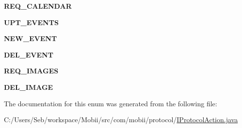 \begin{DoxyCompactItemize}
\item 
\hypertarget{enumcom_1_1mobii_1_1protocol_1_1_i_protocol_action_1_1cli_to_mob_a2282bc120d7a36f6180b37abd3b931c3}{{\bfseries R\-E\-Q\-\_\-\-C\-A\-L\-E\-N\-D\-A\-R}}\label{enumcom_1_1mobii_1_1protocol_1_1_i_protocol_action_1_1cli_to_mob_a2282bc120d7a36f6180b37abd3b931c3}

\item 
\hypertarget{enumcom_1_1mobii_1_1protocol_1_1_i_protocol_action_1_1cli_to_mob_af9a569aaf8d6ddeb48fe2a28d16efc7f}{{\bfseries U\-P\-T\-\_\-\-E\-V\-E\-N\-T\-S}}\label{enumcom_1_1mobii_1_1protocol_1_1_i_protocol_action_1_1cli_to_mob_af9a569aaf8d6ddeb48fe2a28d16efc7f}

\item 
\hypertarget{enumcom_1_1mobii_1_1protocol_1_1_i_protocol_action_1_1cli_to_mob_a0a559ebcd7fc42cbaae9cf6b1a059a89}{{\bfseries N\-E\-W\-\_\-\-E\-V\-E\-N\-T}}\label{enumcom_1_1mobii_1_1protocol_1_1_i_protocol_action_1_1cli_to_mob_a0a559ebcd7fc42cbaae9cf6b1a059a89}

\item 
\hypertarget{enumcom_1_1mobii_1_1protocol_1_1_i_protocol_action_1_1cli_to_mob_a8673719261b6d53fb43956512020cdf9}{{\bfseries D\-E\-L\-\_\-\-E\-V\-E\-N\-T}}\label{enumcom_1_1mobii_1_1protocol_1_1_i_protocol_action_1_1cli_to_mob_a8673719261b6d53fb43956512020cdf9}

\item 
\hypertarget{enumcom_1_1mobii_1_1protocol_1_1_i_protocol_action_1_1cli_to_mob_a8926d5405f606fee955d5790f5ff5541}{{\bfseries R\-E\-Q\-\_\-\-I\-M\-A\-G\-E\-S}}\label{enumcom_1_1mobii_1_1protocol_1_1_i_protocol_action_1_1cli_to_mob_a8926d5405f606fee955d5790f5ff5541}

\item 
\hypertarget{enumcom_1_1mobii_1_1protocol_1_1_i_protocol_action_1_1cli_to_mob_a36d74e43a25b84f575285928ea7f00b0}{{\bfseries D\-E\-L\-\_\-\-I\-M\-A\-G\-E}}\label{enumcom_1_1mobii_1_1protocol_1_1_i_protocol_action_1_1cli_to_mob_a36d74e43a25b84f575285928ea7f00b0}

\end{DoxyCompactItemize}


The documentation for this enum was generated from the following file\-:\begin{DoxyCompactItemize}
\item 
C\-:/\-Users/\-Seb/workspace/\-Mobii/src/com/mobii/protocol/\hyperlink{_i_protocol_action_8java}{I\-Protocol\-Action.\-java}\end{DoxyCompactItemize}
